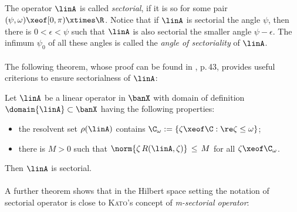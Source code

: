 \documentclass[11pt,twoside]{article}
\begin{document}
\subparagraph{}
The operator $\linA$ is called \textit{sectorial},
if it is so for some pair $(\psi,\omega) \xeof [0,\pi) \xtimes \R$.
Notice that
if $\linA$ is sectorial {\wrt} the angle $\psi$,
then there is $0 < \epsilon < \psi$
such that $\linA$ is also sectorial {\wrt} the smaller angle $\psi - \epsilon$.
The infimum $\psi_0$ of all these angles is called
the \textit{angle of sectoriality} of $\linA$.


\paragraph{} %
The following theorem,
whose proof can be found in \cite{X_Lu}, p.\,43,
provides useful criterions to ensure sectorialness of $\linA$:

\begin{theorem1}\label{CRITERION_FOR_SECTORIALNESS}
Let  $\linA$ be a linear operator in $\banX$ with domain of definition 
$\domain{\linA} \subset \banX$ having the following properties:

\begin{itemize}[leftmargin=9mm]
\item[(a)]
the resolvent set $\rho(\linA)$ contains
$\C_{\omega} := \{\zeta \xeof \C: \re \zeta \leq \omega\}$;

\item[(b)]
there is $M > 0$ such that
$\norm{\zeta \, R(\linA,\zeta)} \, \leq \, M$ for all $\zeta \xeof \C_{\omega}$.
\end{itemize}
Then $\linA$ is sectorial.
\end{theorem1}

\paragraph{} %
A further theorem shows that
in the Hilbert space setting
the notation of sectorial operator is close to \textsc{Kato}'s concept
of \textit{m-sectorial operator}:
\end{document}
